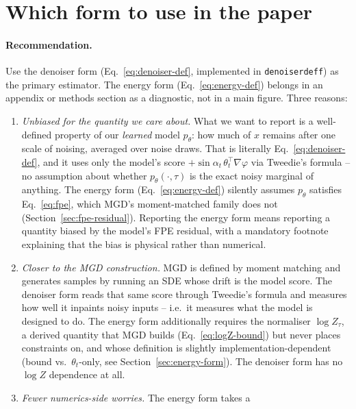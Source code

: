\documentclass[11pt]{article}
\newcommand{\code}[1]{\texttt{#1}}
\renewcommand{\_}{\origunderscore\allowbreak}
\begin{document}
\section{Which form to use in the paper}
\label{sec:paper-choice}

\paragraph{Recommendation.} Use the denoiser form
(Eq.~\ref{eq:denoiser-def}, implemented in
\code{denoiser\_d\_eff}) as the primary estimator. The energy form
(Eq.~\ref{eq:energy-def}) belongs in an appendix or methods section as a
diagnostic, not in a main figure. Three reasons:

\begin{enumerate}
  \item \emph{Unbiased for the quantity we care about.} What we want to
        report is a well-defined property of our \emph{learned} model
        $p_\theta$: how much of $x$ remains after one scale of noising,
        averaged over noise draws. That is literally Eq.~\ref{eq:denoiser-def},
        and it uses only the model's score $+\sin\alpha_t\,\theta_t^\top
        \nabla\varphi$ via Tweedie's formula -- no assumption about
        whether $p_\theta(\cdot,\tau)$ is the exact noisy marginal of
        anything. The energy form (Eq.~\ref{eq:energy-def}) silently
        assumes $p_\theta$ satisfies Eq.~\ref{eq:fpe}, which MGD's
        moment-matched family does not (Section~\ref{sec:fpe-residual}).
        Reporting the energy form means reporting a quantity biased by the
        model's FPE residual, with a mandatory footnote explaining that
        the bias is physical rather than numerical.
  \item \emph{Closer to the MGD construction.} MGD is defined by moment
        matching and generates samples by running an SDE whose drift is
        the model score. The denoiser form reads that same score through
        Tweedie's formula and measures how well it inpaints noisy inputs
        -- i.e.\ it measures what the model is designed to do. The energy
        form additionally requires the normaliser $\log Z_\tau$, a derived
        quantity that MGD builds (Eq.~\ref{eq:logZ-bound}) but never
        places constraints on, and whose definition is slightly
        implementation-dependent (bound vs.\ $\theta_t$-only, see
        Section~\ref{sec:energy-form}). The denoiser form has no $\log Z$
        dependence at all.
  \item \emph{Fewer numerics-side worries.} The energy form takes a

\end{enumerate}
\end{document}
